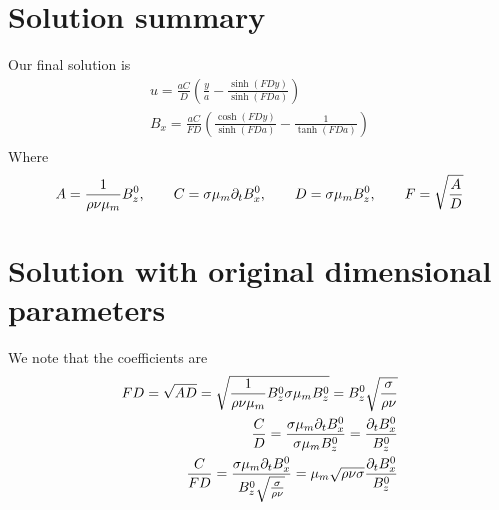 \documentclass[11pt]{article}
\begin{document}
\section{Solution summary}
Our final solution is
\begin{equation}\begin{aligned}
u   = \frac{aC}{D}  \left( \frac{y}{a} - \frac{\sinh(FD y)}{\sinh(FD a)} \right) \\
B_x = \frac{aC}{FD} \left( \frac{\cosh(FD y)}{\sinh(FD a)} - \frac{1}{\tanh(FD a)} \right) \\
\end{aligned} \end{equation}
Where
\begin{equation}\begin{aligned}
A = \frac{1}{\rho \nu {\mu_m}} B_z^0, \qquad
C = \sigma {\mu_m} \partial_t B_x^0, \qquad
D = \sigma {\mu_m} B_z^0, \qquad
F = \sqrt{\frac{A}{D}} \\
\end{aligned} \end{equation}

\section{Solution with original dimensional parameters}
We note that the coefficients are
\begin{equation}\begin{aligned}
FD = \sqrt{AD} = \sqrt{\frac{1}{\rho \nu {\mu_m}} B_z^0 \sigma {\mu_m} B_z^0} = B_z^0 \sqrt{\frac{\sigma}{\rho \nu}} \\
\frac{C}{D} = \frac{\sigma {\mu_m} \partial_t B_x^0}{\sigma {\mu_m} B_z^0} = \frac{\partial_t B_x^0}{ B_z^0} \\
\frac{C}{FD} = \frac{\sigma {\mu_m} \partial_t B_x^0}{B_z^0 \sqrt{\frac{\sigma}{\rho \nu}}} = {\mu_m} \sqrt{\rho \nu \sigma} \frac{\partial_t B_x^0}{B_z^0} \\
\end{aligned} \end{equation}
\end{document}
